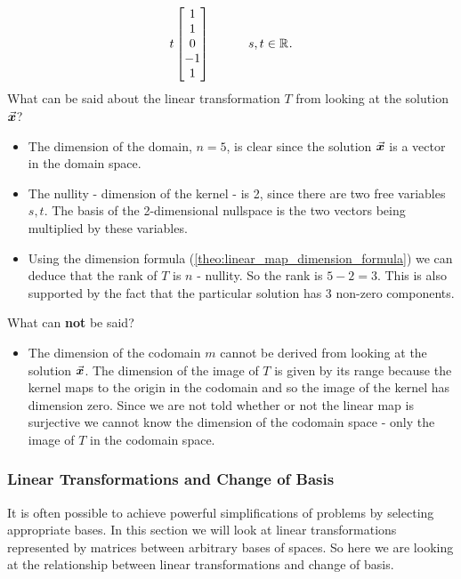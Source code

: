 \documentclass[MathsNotesBase.tex]{subfiles}
\begin{document}
{\begin{exe}
{\[						t \begin{bmatrix}1\\1\\0\\-1\\1\end{bmatrix}
						\hspace{30pt} s,t \in \mathbb{R}^{}.
				\]
				What can be said about the linear transformation $T$ from looking at the solution $\vec{\bm{x}}$?
				\begin{itemize}
					\item{The dimension of the domain, ${ n = 5 }$, is clear since the solution $\vec{\bm{x}}$ is a vector in the domain space.}
					\item{The nullity - dimension of the kernel - is 2, since there are two free variables ${ s,t }$. The basis of the 2-dimensional nullspace is the two vectors being multiplied by these variables.}
					\item{Using the dimension formula (\autoref{theo:linear_map_dimension_formula}) we can deduce that the rank of $T$ is $n$ - nullity. So the rank is ${ 5 - 2 = 3 }$. This is also supported by the fact that the particular solution has 3 non-zero components.}
				\end{itemize}
				What can \textbf{not} be said?
				\begin{itemize}
					\item{The dimension of the codomain $m$ cannot be derived from looking at the solution $\vec{\bm{x}}$. The dimension of the image of $T$ is given by its range because the kernel maps to the origin in the codomain and so the image of the kernel has dimension zero. Since we are not told whether or not the linear map is surjective we cannot know the dimension of the codomain space - only the image of $T$ in the codomain space.}
				\end{itemize}
				\bigskip
			}
			\label{ex:minimal-linear-transformation}
		\end{exe}
	
		\bigskip\bigskip
		\subsubsection{Linear Transformations and Change of Basis}
		\medskip
		It is often possible to achieve powerful simplifications of problems by selecting appropriate bases. In this section we will look at linear transformations represented by matrices between arbitrary bases of spaces. So here we are looking at the relationship between linear transformations and change of basis.\\

}
\end{document}
